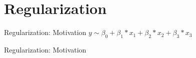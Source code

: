 \documentclass[8pt]{beamer}
\begin{document}
    \section{Regularization}

    \begin{frame}{Regularization: Motivation}
        \centering
        \vfill
        $y \sim \beta_0 + \beta_1 * x_1 + \beta_2 * x_2 + \beta_3 * x_3$
        \vfill
    \end{frame}

    \begin{frame}{Regularization: Motivation}
        \centering
        \vfill
        \vfill
    \end{frame}


\end{document}
